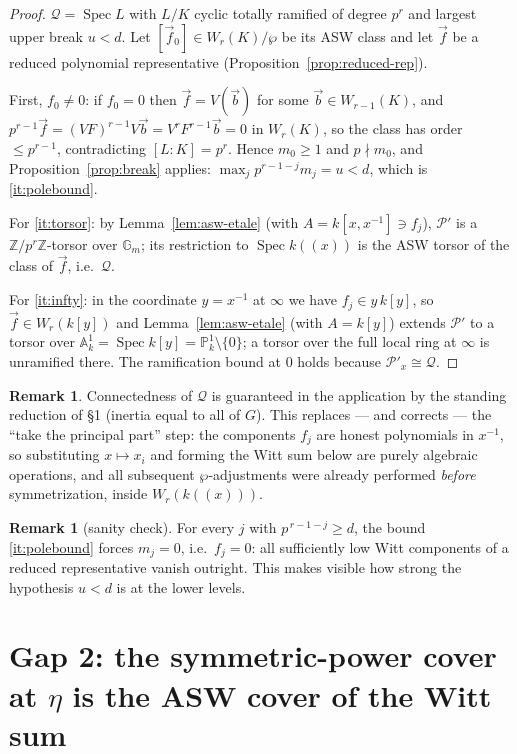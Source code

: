 \documentclass[11pt]{article}
\newcommand{\cP}{\mathcal{P}}
\newcommand{\cQ}{\mathcal{Q}}
\newcommand{\Z}{\mathbb{Z}}
\newcommand{\bG}{\mathbb{G}}
\newcommand{\bP}{\mathbb{P}}
\newcommand{\bA}{\mathbb{A}}
\DeclareMathOperator{\Spec}{Spec}
\newcommand{\AS}{\wp}
\newcommand{\vf}{\vec f}
\theoremstyle{plain}
\theoremstyle{definition}
\newtheorem{remark}[theorem]{Remark}
\begin{document}
\begin{proof}
$\cQ=\Spec L$ with $L/K$ cyclic totally ramified of degree $p^r$ and largest upper break
$u<d$. Let $[\vf_0]\in W_r(K)/\AS$ be its ASW class and let $\vf$ be a reduced polynomial
representative (Proposition~\ref{prop:reduced-rep}).

First, $f_0\neq0$: if $f_0=0$ then $\vf=V(\vec b)$ for some $\vec b\in W_{r-1}(K)$, and
$p^{r-1}\vf=(VF)^{r-1}V\vec b=V^{r}F^{r-1}\vec b=0$ in $W_r(K)$, so the class has order
$\le p^{r-1}$, contradicting $[L:K]=p^r$. Hence $m_0\ge1$ and $p\nmid m_0$, and
Proposition~\ref{prop:break} applies:
$\max_j p^{r-1-j}m_j=u<d$, which is \ref{it:polebound}.

For \ref{it:torsor}: by Lemma~\ref{lem:asw-etale} (with $A=k[x,x^{-1}]\ni f_j$), $\cP'$
is a $\Z/p^r\Z$-torsor over $\bG_m$; its restriction to $\Spec k((x))$ is the ASW torsor
of the class of $\vf$, i.e.\ $\cQ$.

For \ref{it:infty}: in the coordinate $y=x^{-1}$ at $\infty$ we have
$f_j\in y\,k[y]$, so $\vf\in W_r(k[y])$ and Lemma~\ref{lem:asw-etale} (with $A=k[y]$)
extends $\cP'$ to a torsor over $\bA^1_k=\Spec k[y]=\bP^1_k\setminus\{0\}$; a torsor
over the full local ring at $\infty$ is unramified there. The ramification bound at $0$
holds because $\cP'_x\cong\cQ$.
\end{proof}

\begin{remark}
Connectedness of $\cQ$ is guaranteed in the application by the standing reduction of
\S1 (inertia equal to all of $G$). This replaces --- and corrects --- the ``take the
principal part'' step: the components $f_j$ are honest polynomials in $x^{-1}$, so
substituting $x\mapsto x_i$ and forming the Witt sum below are purely algebraic
operations, and all subsequent $\AS$-adjustments were already performed \emph{before}
symmetrization, inside $W_r(k((x)))$.
\end{remark}

\begin{remark}[sanity check]\label{rem:sanity}
For every $j$ with $p^{\,r-1-j}\ge d$, the bound \ref{it:polebound} forces $m_j=0$, i.e.\
$f_j=0$: all sufficiently low Witt components of a reduced representative vanish
outright. This makes visible how strong the hypothesis $u<d$ is at the lower levels.
\end{remark}

\section{Gap 2: the symmetric-power cover at $\eta$ is the ASW cover of the Witt sum}
\end{document}
